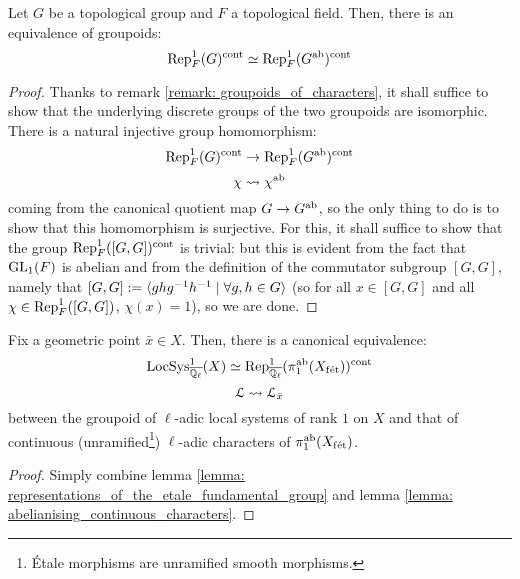         \begin{lemma} \label{lemma: abelianising_continuous_characters}
            Let $G$ be a topological group and $F$ a topological field. Then, there is an equivalence of groupoids:
                $$\mathrm{Rep}^1_F(G)^{\mathrm{cont}} \simeq \mathrm{Rep}^1_F(G^{\mathrm{ab}})^{\mathrm{cont}}$$
        \end{lemma}
            \begin{proof}
                Thanks to remark \ref{remark: groupoids_of_characters}, it shall suffice to show that the underlying discrete groups of the two groupoids are isomorphic. There is a natural injective group homomorphism:
                    $$\mathrm{Rep}^1_F(G)^{\mathrm{cont}} \to \mathrm{Rep}^1_F(G^{\mathrm{ab}})^{\mathrm{cont}}$$
                    $$\chi \leadsto \chi^{\mathrm{ab}}$$
                coming from the canonical quotient map $G \to G^{\mathrm{ab}}$, so the only thing to do is to show that this homomorphism is surjective. For this, it shall suffice to show that the group $\mathrm{Rep}^1_F([G, G])^{\mathrm{cont}}$ is trivial: but this is evident from the fact that $\operatorname{GL}_1(F)$ is abelian and from the definition of the commutator subgroup $[G, G]$, namely that $[G, G] := \langle ghg^{-1}h^{-1} \mid \forall g, h \in G\rangle$ (so for all $x \in [G, G]$ and all $\chi \in \mathrm{Rep}^1_F([G, G])$, $\chi(x) = 1$), so we are done.
            \end{proof}
        \begin{theorem} \label{theorem: unramified_representations_are_sheaves_on_X}
            Fix a geometric point $\bar{x} \in X$. Then, there is a canonical equivalence:
                $$\mathrm{LocSys}^1_{\overline{\mathbb{Q}_{\ell}}}(X) \simeq \mathrm{Rep}^1_{\overline{\mathbb{Q}_{\ell}}}(\pi_1^{\mathrm{ab}}(X_{\mathrm{f\acute{e}t}}))^{\mathrm{cont}}$$
                $$\mathcal{L} \leadsto \mathcal{L}_{\bar{x}}$$
            between the groupoid of $\ell$-adic local systems of rank $1$ on $X$ and that of continuous (unramified\footnote{\'Etale morphisms are unramified smooth morphisms.}) $\ell$-adic characters of $\pi_1^{\mathrm{ab}}(X_{\mathrm{f\acute{e}t}})$.
        \end{theorem}
            \begin{proof}
                Simply combine lemma \ref{lemma: representations_of_the_etale_fundamental_group} and lemma \ref{lemma: abelianising_continuous_characters}.
            \end{proof}
